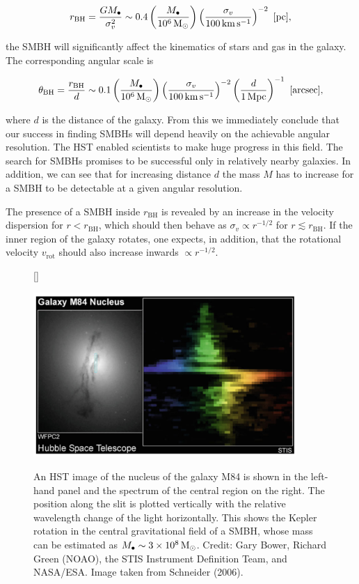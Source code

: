 \documentclass[a4paper,10pt]{article}
\begin{document}
\begin{align*}
    r_\mathrm{BH} = \frac{GM_\bullet}{\sigma_v^2} \sim 0.4\left(\frac{M_\bullet}{10^6\,{\rm M_\odot}}\right)\left(\frac{\sigma_v}{100\,{\rm km\,s^{-1}}}\right)^{-2} ~ [{\rm pc}],
\end{align*}

{\noindent}the SMBH will significantly affect the kinematics of stars and gas in the galaxy. The corresponding angular scale is

\begin{align*}
    \theta_\mathrm{BH} = \frac{r_\mathrm{BH}}{d} \sim 0.1\left(\frac{M_\bullet}{10^6\,{\rm M_\odot}}\right) \left(\frac{\sigma_v}{100\,{\rm km\,s^{-1}}}\right)^{-2} \left(\frac{d}{1\,{\rm Mpc}}\right)^{-1} ~ [{\rm arcsec}],
\end{align*}

{\noindent}where $d$ is the distance of the galaxy. From this we immediately conclude that our success in finding SMBHs will depend heavily on the achievable angular resolution. The HST enabled scientists to make huge progress in this field. The search for SMBHs promises to be successful only in relatively nearby galaxies. In addition, we can see that for increasing distance $d$ the mass $M$  has to increase for a SMBH to be detectable at a given angular resolution.

{\noindent}The presence of a SMBH inside $r_\mathrm{BH}$ is revealed by an increase in the velocity dispersion for $r<r_\mathrm{BH}$, which should then behave as  $\sigma_v\propto r^{-1/2}$ for $r\lesssim r_\mathrm{BH}$. If the inner region of the galaxy rotates, one expects, in addition, that the rotational velocity $v_\mathrm{rot}$ should also increase inwards $\propto r^{-1/2}$.

\begin{figure}[t]
    [\FBwidth]
    {\caption{\footnotesize{An HST image of the nucleus of the galaxy M84 is shown in the left-hand panel and the spectrum of the central region on the right. The position along the slit is plotted vertically with the relative wavelength change of the light horizontally. This shows the Kepler rotation in the central gravitational field of a SMBH, whose mass can be estimated as $M_\bullet \sim 3\times10^8\,{\rm M_\odot}$. Credit: Gary Bower, Richard Green (NOAO), the STIS Instrument Definition Team, and NASA/ESA. Image taken from Schneider (2006).}}
    \label{fig:m84hst}}
    {\includegraphics[width=10cm]{figures/M84HST.png}}
\end{figure}
\end{document}
